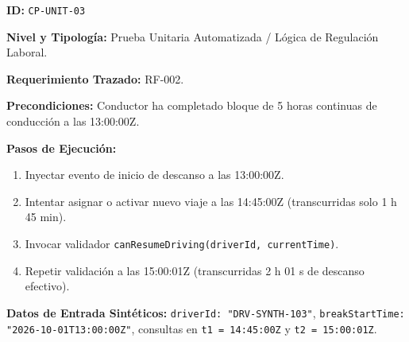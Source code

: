 \par\noindent\textbf{ID:} \texttt{C\allowbreak{}P\allowbreak{}-\allowbreak{}U\allowbreak{}N\allowbreak{}I\allowbreak{}T\allowbreak{}-\allowbreak{}0\allowbreak{}3\allowbreak{}}\par
\par\noindent\textbf{Nivel y Tipología:} Prueba Unitaria Automatizada / Lógica de Regulación Laboral.\par
\par\noindent\textbf{Requerimiento Trazado:} RF-002.\par
\par\noindent\textbf{Precondiciones:} Conductor ha completado bloque de 5 horas continuas de conducción a las 13:00:00Z.\par
\par\noindent\textbf{Pasos de Ejecución:} \par
\begin{enumerate}
\item Inyectar evento de inicio de descanso a las 13:00:00Z.
\item Intentar asignar o activar nuevo viaje a las 14:45:00Z (transcurridas solo 1 h 45 min).
\item Invocar validador \texttt{c\allowbreak{}a\allowbreak{}n\allowbreak{}R\allowbreak{}e\allowbreak{}s\allowbreak{}u\allowbreak{}m\allowbreak{}e\allowbreak{}D\allowbreak{}r\allowbreak{}i\allowbreak{}v\allowbreak{}i\allowbreak{}n\allowbreak{}g\allowbreak{}(\allowbreak{}d\allowbreak{}r\allowbreak{}i\allowbreak{}v\allowbreak{}e\allowbreak{}r\allowbreak{}I\allowbreak{}d\allowbreak{},\allowbreak{} c\allowbreak{}u\allowbreak{}r\allowbreak{}r\allowbreak{}e\allowbreak{}n\allowbreak{}t\allowbreak{}T\allowbreak{}i\allowbreak{}m\allowbreak{}e\allowbreak{})\allowbreak{}}.
\item Repetir validación a las 15:00:01Z (transcurridas 2 h 01 s de descanso efectivo).
\end{enumerate}
\par\noindent\textbf{Datos de Entrada Sintéticos:} \texttt{d\allowbreak{}r\allowbreak{}i\allowbreak{}v\allowbreak{}e\allowbreak{}r\allowbreak{}I\allowbreak{}d\allowbreak{}:\allowbreak{} "\allowbreak{}D\allowbreak{}R\allowbreak{}V\allowbreak{}-\allowbreak{}S\allowbreak{}Y\allowbreak{}N\allowbreak{}T\allowbreak{}H\allowbreak{}-\allowbreak{}1\allowbreak{}0\allowbreak{}3\allowbreak{}"\allowbreak{}}, \texttt{b\allowbreak{}r\allowbreak{}e\allowbreak{}a\allowbreak{}k\allowbreak{}S\allowbreak{}t\allowbreak{}a\allowbreak{}r\allowbreak{}t\allowbreak{}T\allowbreak{}i\allowbreak{}m\allowbreak{}e\allowbreak{}:\allowbreak{} "\allowbreak{}2\allowbreak{}0\allowbreak{}2\allowbreak{}6\allowbreak{}-\allowbreak{}1\allowbreak{}0\allowbreak{}-\allowbreak{}0\allowbreak{}1\allowbreak{}T\allowbreak{}1\allowbreak{}3\allowbreak{}:\allowbreak{}0\allowbreak{}0\allowbreak{}:\allowbreak{}0\allowbreak{}0\allowbreak{}Z\allowbreak{}"\allowbreak{}}, consultas en \texttt{t\allowbreak{}1\allowbreak{} =\allowbreak{} 1\allowbreak{}4\allowbreak{}:\allowbreak{}4\allowbreak{}5\allowbreak{}:\allowbreak{}0\allowbreak{}0\allowbreak{}Z\allowbreak{}} y \texttt{t\allowbreak{}2\allowbreak{} =\allowbreak{} 1\allowbreak{}5\allowbreak{}:\allowbreak{}0\allowbreak{}0\allowbreak{}:\allowbreak{}0\allowbreak{}1\allowbreak{}Z\allowbreak{}}.\par
